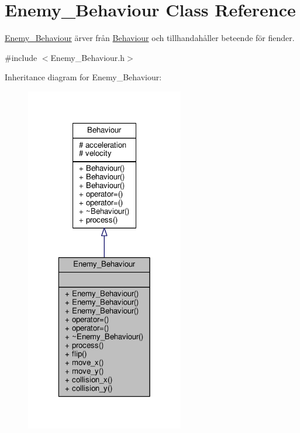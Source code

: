 \hypertarget{classEnemy__Behaviour}{\section{Enemy\+\_\+\+Behaviour Class Reference}
\label{classEnemy__Behaviour}
}


\hyperlink{classEnemy__Behaviour}{Enemy\+\_\+\+Behaviour} ärver från \hyperlink{classBehaviour}{Behaviour} och tillhandahåller beteende för fiender.  




{\ttfamily \#include $<$Enemy\+\_\+\+Behaviour.\+h$>$}



Inheritance diagram for Enemy\+\_\+\+Behaviour\+:\nopagebreak
\begin{figure}[H]
\begin{center}
\leavevmode
\includegraphics[width=196pt]{classEnemy__Behaviour__inherit__graph}
\end{center}
\end{figure}


